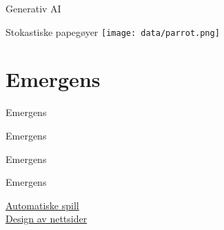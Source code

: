 \documentclass[8pt]{beamer}
\begin{document}
	\begin{frame}{Generativ AI} %
		\centering
	\end{frame}

	\begin{frame}{Stokastiske papegøyer} %
		\centering
		\vfill
		\texttt{[image: data/parrot.png]}
		\vfill
	\end{frame}

	\section{Emergens}

	\begin{frame}{Emergens} %
		\centering
	\end{frame}

	\begin{frame}{Emergens} %
		\centering
	\end{frame}

	\begin{frame}{Emergens} %
		\centering
	\end{frame}

	\begin{frame}{Emergens} %
		\centering

		\href{https://twitter.com/i/status/1636477569565335553}{Automatiske spill}\\
		\href{https://twitter.com/AiGigachad/status/1637553328056827904}{Design av nettsider}
	\end{frame}
\end{document}
